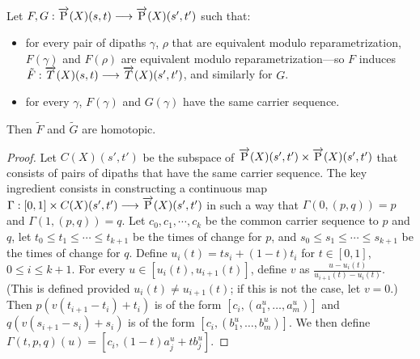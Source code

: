 \begin{lemme}
\label{lem:tech}
  Let $F,G : \overrightarrow{\text{P}}(X)(s,t) \longrightarrow \overrightarrow{\text{P}}(X)(s',t')$ such that:
  \begin{itemize}
  \item for every pair of dipaths $\gamma$, $\rho$ that are equivalent modulo
    reparametrization, $F(\gamma)$ and $F(\rho)$ are equivalent modulo
    reparametrization---so $F$ induces
    $\tilde{F} : \overrightarrow{T}(X)(s,t) \longrightarrow \overrightarrow{T}(X)(s',t')$, and
    similarly for $G$.
  \item for every $\gamma$, $F(\gamma)$ and $G(\gamma)$ have the same carrier sequence.
  \end{itemize}
  Then $\tilde{F}$ and $\tilde{G}$ are homotopic.
\end{lemme}

\begin{proof}
  Let $C(X)(s',t')$ be the subspace of $\overrightarrow{\text{P}}(X)(s',t')\times\overrightarrow{\text{P}}(X)(s',t')$
  that consists of pairs of dipaths that have the same carrier
  sequence. The key ingredient consists in constructing a continuous
  map $\Gamma : [0,1]\times C(X)(s',t') \longrightarrow \overrightarrow{\text{P}}(X)(s',t')$ in such a way
  that $\Gamma (0, (p, q)) = p$ and $\Gamma (1, (p, q)) = q$.  Let
  $c_0, c_1, \cdots, c_k$ be the common carrier sequence to $p$ and
  $q$, let $t_0\leq t_1 \leq \cdots\leq t_{k+1}$ be the times of
  change for $p$, and $s_0 \leq s_1 \leq \cdots \leq s_{k+1}$ be the
  times of change for $q$.  Define $u_i (t) = ts_i + (1-t)t_i$ for $t
  \in [0, 1]$, $0\leq i\leq k+1$.  For every $u \in [u_i(t),
  u_{i+1}(t)]$, define $v$ as $\frac{u-u_i(t)}{u_{i+1}(t)-u_i(t)}$.
  (This is defined provided $u_i(t)\neq u_{i+1}(t)$; if this is not
  the case, let $v=0$.)  Then $p(v(t_{i+1}-t_i) + t_i)$ is of the form
  $[c_i,(a_1^u,\ldots,a_m^u)]$ and $q(v(s_{i+1}-s_i) + s_i)$ is of the
  form $[c_i,(b_1^u,\ldots,b_m^u)]$. We then define $\Gamma(t,p,q)(u)
  = [c_i,(1-t)a_j^u+tb_j^u]$.


\end{proof}
